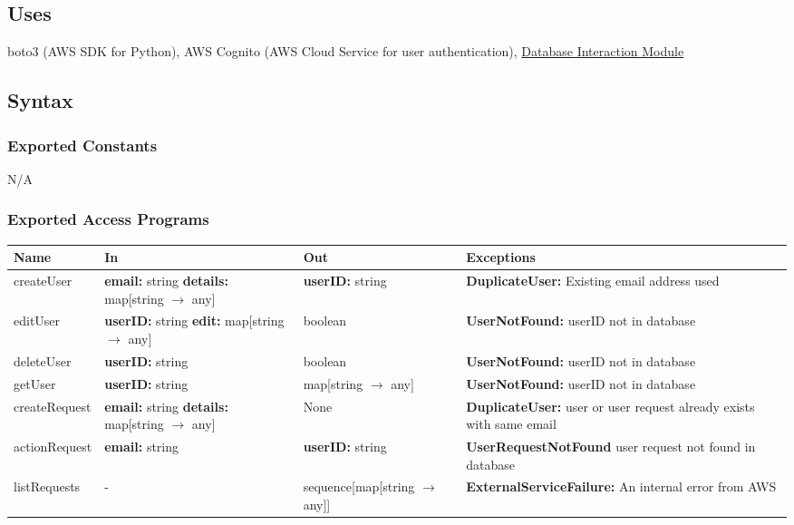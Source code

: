 \documentclass[12pt, titlepage]{article}
\begin{document}
{  \subsection{Uses}

  boto3 (AWS SDK for Python), AWS Cognito (AWS Cloud Service for user
  authentication), \hyperref[sec:DI]{Database Interaction Module}

  \subsection{Syntax}

  \subsubsection{Exported Constants}

  N/A

  \subsubsection{Exported Access Programs}

  \begin{center}
    \begin{tabular}{>{\raggedright}p{2.5cm} >{\raggedright}p{3.5cm}
      >{\raggedright}p{3.5cm} p{5cm}}
      \hline
      \textbf{Name} & \textbf{In} & \textbf{Out} & \textbf{Exceptions} \\
      \hline
      createUser & \textbf{email:} string \newline
      \textbf{details:} map[string $\rightarrow$ any] &
      \textbf{userID:} string &
      \textbf{DuplicateUser:} Existing email address used \\
      \hline
      editUser & \textbf{userID:} string \newline
      \textbf{edit:} map[string $\rightarrow$ any] & boolean &
      \textbf{UserNotFound:}
      userID not in database \\
      \hline
      deleteUser & \textbf{userID:} string & boolean & \textbf{UserNotFound:}
      userID not in database \\
      \hline
      getUser & \textbf{userID:} string & map[string $\rightarrow$ any]
      & \textbf{UserNotFound:}
      userID not in database \\
      \hline
      createRequest & \textbf{email:} string \newline \textbf{details:}
      map[string $\rightarrow$ any] & None
      & \textbf{DuplicateUser:}
      user or user request already exists with same email \\
      \hline
      actionRequest & \textbf{email:} string & \textbf{userID:} string
      & \textbf{UserRequestNotFound}
      user request not found in database\\
      \hline
      listRequests & - & sequence[map[string $\rightarrow$ any]] &
      \textbf{ExternalServiceFailure:} An internal error from AWS\\
      \hline
    \end{tabular}
  \end{center}

}
\end{document}
